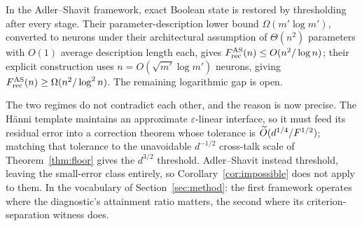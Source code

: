 In the Adler--Shavit framework, exact Boolean state is restored by thresholding after every
stage. Their parameter-description lower bound $\Omega(m'\log m')$, converted to neurons under
their architectural assumption of $\Theta(n^2)$ parameters with $O(1)$ average description
length each, gives $F_{\mathrm{rec}}^{\mathrm{AS}}(n)\le O(n^2/\log n)$; their explicit construction uses
$n=O(\sqrt{m'}\log m')$ neurons, giving $F_{\mathrm{rec}}^{\mathrm{AS}}(n)\ge\Omega(n^2/\log^2 n)$. The remaining
logarithmic gap is open.

The two regimes do not contradict each other, and the reason is now precise. The H\"{a}nni
template maintains an approximate $\varepsilon$-linear interface, so it must feed its residual
error into a correction theorem whose tolerance is $\widetilde{O}(d^{1/4}/F^{1/2})$; matching that
tolerance to the unavoidable $d^{-1/2}$ cross-talk scale of Theorem~\ref{thm:floor} gives the
$d^{3/2}$ threshold. Adler--Shavit instead threshold, leaving the small-error class entirely,
so Corollary~\ref{cor:impossible} does not apply to them. In the vocabulary of
Section~\ref{sec:method}: the first framework operates where the diagnostic's attainment ratio
matters, the second where its criterion-separation witness does.

